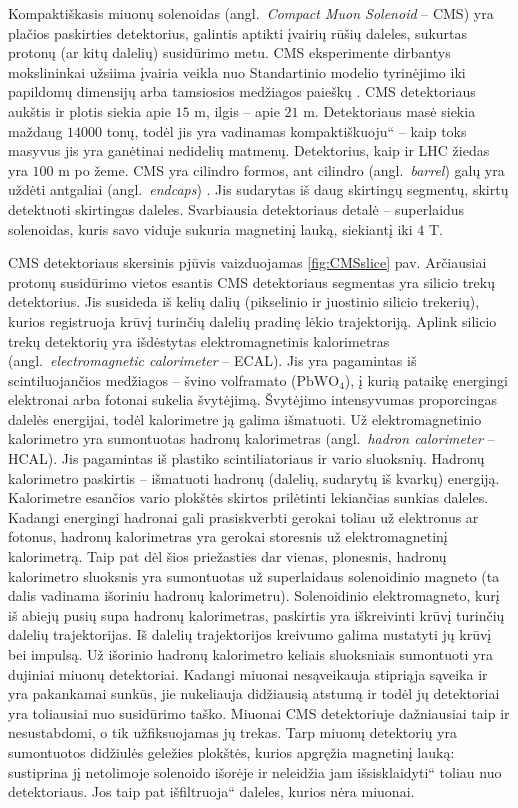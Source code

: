\documentclass[a4paper, 12pt]{article}
\newcommand{\ltq}[1]{{\quotedblbase{}#1\textquotedblleft{}}}
\newlength\q
\begin{document}
Kompaktiškasis miuonų solenoidas (angl.\ \textit{Compact Muon Solenoid} -- CMS) yra plačios paskirties detektorius, galintis aptikti įvairių rūšių daleles, sukurtas protonų (ar kitų dalelių) susidūrimo metu. CMS eksperimente dirbantys mokslininkai užsiima įvairia veikla nuo Standartinio modelio tyrinėjimo iki papildomų dimensijų arba tamsiosios medžiagos paieškų \cite{CMSdetector}.
CMS detektoriaus aukštis ir plotis siekia apie $15$ m, ilgis -- apie $21$ m. Detektoriaus masė siekia maždaug $14000$ tonų, todėl jis yra vadinamas \ltq{kompaktiškuoju} -- kaip toks masyvus jis yra ganėtinai nedidelių matmenų. Detektorius, kaip ir LHC žiedas yra $100$ m po žeme. CMS yra cilindro formos, ant cilindro (angl.\ \textit{barrel}) galų yra uždėti antgaliai (angl.\ \textit{endcaps}) \cite{cmseta}. Jis sudarytas iš daug skirtingų segmentų, skirtų detektuoti skirtingas daleles. Svarbiausia detektoriaus detalė -- superlaidus solenoidas, kuris savo viduje sukuria magnetinį lauką, siekiantį iki $4$ T.

CMS detektoriaus skersinis pjūvis vaizduojamas \ref{fig:CMSslice} pav. Arčiausiai protonų susidūrimo vietos esantis CMS detektoriaus segmentas yra silicio trekų detektorius. Jis susideda iš kelių dalių (pikselinio ir juostinio silicio trekerių), kurios registruoja krūvį turinčių dalelių pradinę lėkio trajektoriją. Aplink silicio trekų detektorių yra išdėstytas elektromagnetinis kalorimetras (angl.\ \textit{electromagnetic calorimeter} -- ECAL). Jis yra pagamintas iš scintiluojančios medžiagos -- švino volframato ($\mathrm{PbWO}_{4}$), į kurią pataikę energingi elektronai arba fotonai sukelia švytėjimą. Švytėjimo intensyvumas proporcingas dalelės energijai, todėl kalorimetre ją galima išmatuoti\cite{Ecal}. Už elektromagnetinio kalorimetro yra sumontuotas hadronų kalorimetras (angl.\ \textit{hadron calorimeter} -- HCAL). Jis pagamintas iš plastiko scintiliatoriaus ir vario sluoksnių. Hadronų kalorimetro paskirtis -- išmatuoti hadronų (dalelių, sudarytų iš kvarkų) energiją. Kalorimetre esančios vario plokštės skirtos prilėtinti lekiančias sunkias daleles. Kadangi energingi hadronai gali prasiskverbti gerokai toliau už elektronus ar fotonus, hadronų kalorimetras yra gerokai storesnis už elektromagnetinį kalorimetrą. Taip pat  dėl šios priežasties dar vienas, plonesnis, hadronų kalorimetro sluoksnis yra sumontuotas už superlaidaus solenoidinio magneto (ta dalis vadinama išoriniu hadronų kalorimetru). Solenoidinio elektromagneto, kurį iš abiejų pusių supa hadronų kalorimetras, paskirtis yra iškreivinti krūvį turinčių dalelių trajektorijas. Iš dalelių trajektorijos kreivumo galima nustatyti jų krūvį bei impulsą. Už išorinio hadronų kalorimetro keliais sluoksniais sumontuoti yra dujiniai miuonų detektoriai. Kadangi miuonai nesąveikauja stipriąja sąveika ir yra pakankamai sunkūs, jie nukeliauja didžiausią atstumą ir todėl jų detektoriai yra toliausiai nuo susidūrimo taško. Miuonai CMS detektoriuje dažniausiai taip ir nesustabdomi, o tik užfiksuojamas jų trekas. Tarp miuonų detektorių yra sumontuotos didžiulės geležies plokštės, kurios apgręžia magnetinį lauką: sustiprina jį netolimoje solenoido išorėje ir neleidžia jam \ltq{išsisklaidyti} toliau nuo detektoriaus. Jos taip pat \ltq{išfiltruoja} daleles, kurios nėra miuonai\cite{Solenoid}.
\end{document}
